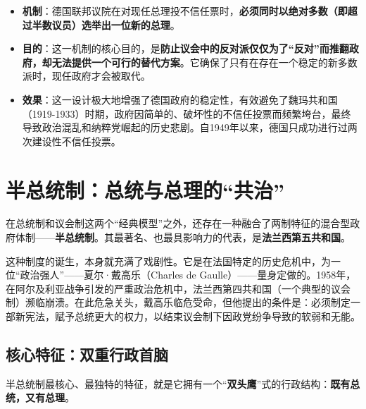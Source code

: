 \begin{itemize}
    \item \textbf{机制}：德国联邦议院在对现任总理投不信任票时，\textbf{必须同时以绝对多数（即超过半数议员）选举出一位新的总理}。
    \item \textbf{目的}：这一机制的核心目的，是\textbf{防止议会中的反对派仅仅为了“反对”而推翻政府，却无法提供一个可行的替代方案}。它确保了只有在存在一个稳定的新多数派时，现任政府才会被取代。
    \item \textbf{效果}：这一设计极大地增强了德国政府的稳定性，有效避免了魏玛共和国（1919-1933）时期，政府因简单的、破坏性的不信任投票而频繁垮台，最终导致政治混乱和纳粹党崛起的历史悲剧。自1949年以来，德国只成功进行过两次建设性不信任投票。
\end{itemize}

\hrulefill

\section{半总统制：总统与总理的“共治”}

在总统制和议会制这两个“经典模型”之外，还存在一种融合了两制特征的混合型政府体制——\textbf{半总统制}。其最著名、也最具影响力的代表，是\textbf{法兰西第五共和国}。

这种制度的诞生，本身就充满了戏剧性。它是在法国特定的历史危机中，为一位“政治强人”——夏尔·戴高乐（Charles de Gaulle）——量身定做的。1958年，在阿尔及利亚战争引发的严重政治危机中，法兰西第四共和国（一个典型的议会制）濒临崩溃。在此危急关头，戴高乐临危受命，但他提出的条件是：必须制定一部新宪法，赋予总统更大的权力，以结束议会制下因政党纷争导致的软弱和无能。

\subsection{核心特征：双重行政首脑}

半总统制最核心、最独特的特征，就是它拥有一个“\textbf{双头鹰}”式的行政结构：\textbf{既有总统，又有总理}。

